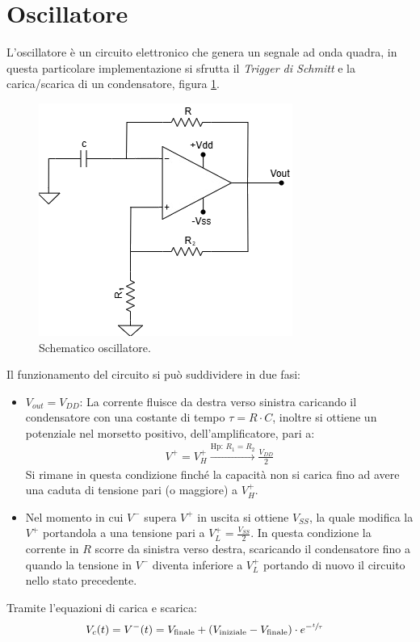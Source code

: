 \documentclass[a4paper,12pt]{article}
\begin{document}
\section*{Oscillatore}
L'oscillatore è un circuito elettronico che genera un segnale ad onda quadra, in questa particolare implementazione si sfrutta il \textit{Trigger di Schmitt} e la carica/scarica di un condensatore, figura \ref{fig:schematico_oscillatore}.
\begin{figure}
	\centering
	\includegraphics[width=0.4\linewidth]{immagini/ocillatore/circuito.png}
	\caption{Schematico oscillatore.}
	\label{fig:schematico_oscillatore}
\end{figure}
Il funzionamento del circuito si può suddividere in due fasi:
\begin{itemize}
	\item $V_{out} = V_{DD}$: La corrente fluisce da destra verso sinistra caricando il condensatore con una costante di tempo $\tau = R \cdot C$, inoltre si ottiene un potenziale nel morsetto positivo, dell'amplificatore, pari a:
	      \begin{align*}
		      V^+ = V^+_H \xrightarrow{\mathrm{Hp:}\,R_1 = R_2} \frac{V_{DD}}{2}
	      \end{align*}
	      Si rimane in questa condizione finché la capacità non si carica fino ad avere una caduta di tensione pari (o maggiore) a $V^+_H$.
	\item Nel momento in cui $V^-$ supera $V^+$ in uscita si ottiene $V_{SS}$, la quale modifica la $V^+$ portandola a una tensione pari a $V^+_L = \frac{V_{SS}}{2}$. In questa condizione la corrente in $R$ scorre da sinistra verso destra, scaricando il condensatore fino a quando la tensione in $V^-$ diventa inferiore a $V^+_L$ portando di nuovo il circuito nello stato precedente.
\end{itemize}
Tramite l'equazioni di carica e scarica:
\begin{align*}
	V_c (t) = V^- (t) & = V_{\text{finale}} + (V_{\text{iniziale}} - V_{\text{finale}} ) \cdot e^{-\sfrac{t}{\tau}}
\end{align*}
\end{document}
